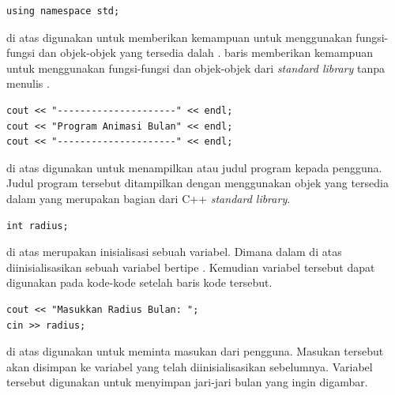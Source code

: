 \documentclass[../main.tex]{subfiles}
\begin{document}
\begin{code}
\begin{verbatim}
using namespace std;
\end{verbatim}
\end{code}

{\Script} di atas digunakan untuk memberikan kemampuan untuk menggunakan fungsi-fungsi dan objek-objek yang tersedia dalah {\header} {\file} . {\Script} baris  memberikan kemampuan untuk menggunakan fungsi-fungsi dan objek-objek dari \textit{standard library} tanpa menulis .

\begin{code}
\begin{verbatim}
cout << "---------------------" << endl;
cout << "Program Animasi Bulan" << endl;
cout << "---------------------" << endl;
\end{verbatim}
\end{code}

{\Script} di atas digunakan untuk menampilkan {\header} atau judul program kepada pengguna. Judul program tersebut ditampilkan dengan menggunakan objek  yang tersedia dalam {\header} {\file}  yang merupakan bagian dari C++ \textit{standard library}.

\begin{code}
\begin{verbatim}
int radius;
\end{verbatim}
\end{code}

{\Script} di atas merupakan {\statement} inisialisasi sebuah variabel. Dimana dalam {\script} di atas diinisialisasikan sebuah variabel  bertipe . Kemudian variabel  tersebut dapat digunakan pada kode-kode setelah baris kode {\script} tersebut.

\begin{code}
\begin{verbatim}
cout << "Masukkan Radius Bulan: ";
cin >> radius;
\end{verbatim}
\end{code}

{\Script} di atas digunakan untuk meminta masukan dari pengguna. Masukan tersebut akan disimpan ke variabel  yang telah diinisialisasikan sebelumnya. Variabel  tersebut digunakan untuk menyimpan jari-jari bulan yang ingin digambar.
\end{document}
